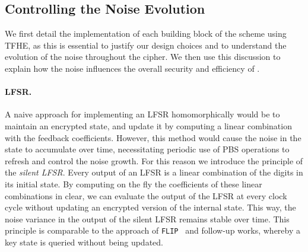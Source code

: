 




\subsection{Controlling the Noise Evolution}%
\label{sec:rationale-controllin-noise}

We first detail the implementation of each building block of the scheme using TFHE, as this is essential to justify our design choices and to understand the evolution of the noise throughout the cipher. We then use this discussion to explain how the noise influences the overall security and efficiency of \coolName.

\paragraph{LFSR.} A naive approach for implementing an LFSR  homomorphically would be to maintain an encrypted state, and update it by computing a linear combination with the feedback coefficients. However, this method would cause the noise in the state to accumulate over time, necessitating periodic use of PBS operations to refresh and control the noise growth. For this reason we introduce the principle of the \emph{silent LFSR}. Every output of an LFSR is a linear combination of the digits in its initial state. By computing on the fly the coefficients of these linear combinations in clear, we can evaluate the output of the LFSR at every clock cycle without updating an encrypted version of the internal state. This way, the noise variance in the output of the silent LFSR remains stable over time. This principle is comparable to the approach of {\tt FLIP}~\cite{EC:MJSC16} and follow-up works, whereby a key state is queried without being updated. 


